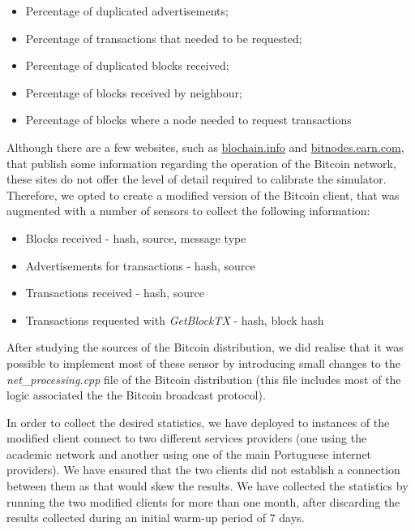 \begin{itemize}
    \item Percentage of duplicated advertisements;
    \item Percentage of transactions that needed to be requested;
    \item Percentage of duplicated blocks received;
    \item Percentage of blocks received by neighbour;
    \item Percentage of blocks where a node needed to request transactions
\end{itemize}

Although there are a few websites, such as \url{blochain.info} and \url{bitnodes.earn.com}, that publish some information regarding the operation of the Bitcoin network, these sites do not offer the level of detail required to calibrate the simulator.  Therefore, we opted to create a modified version of the Bitcoin client, that was augmented with a number of sensors to collect the following information:

\begin{itemize}
    \item Blocks received - hash, source, message type
    \item Advertisements for transactions - hash, source
    \item Transactions received - hash, source
    \item Transactions requested with \textsl{GetBlockTX} - hash, block hash
\end{itemize}

After studying the sources of the Bitcoin distribution, we did realise that it was possible to implement most of these sensor by introducing small changes to the \textsl{net\_processing.cpp} file of the Bitcoin distribution (this file includes most of the logic associated the the Bitcoin broadcast protocol).

In order to collect the desired statistics, we have deployed to instances of the modified client connect to two different services providers (one using the academic network and another using one of the main Portuguese internet providers). We have ensured that the two clients did not establish a connection between them as that would skew the results. We have collected the statistics by running the two modified clients for more than one month, after discarding the results collected during an initial warm-up period of 7 days.


